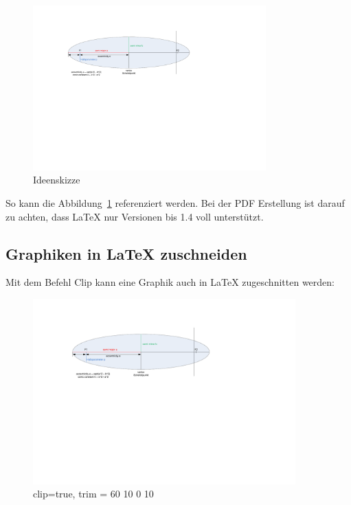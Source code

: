 \begin{figure}[H]
	\centering
		\includegraphics[width=0.8\textwidth]{images/visio/visio.pdf}
	\caption{Ideenskizze}
	\label{fig.Skizze}
\end{figure}

So kann die Abbildung~\ref{fig.Skizze} referenziert werden. Bei der PDF Erstellung ist darauf zu achten, dass LaTeX nur Versionen bis 1.4 voll unterstützt. 



\subsection{Graphiken in LaTeX zuschneiden}\label{zuschneiden}
Mit dem Befehl Clip kann eine Graphik auch in LaTeX zugeschnitten werden:

\begin{figure}[H]
	\centering
		\includegraphics[width=0.9\textwidth, clip=true, trim = 80 10 0 10]{images/visio/visio.pdf}  %
	\caption{clip=true, trim = 60 10 0 10}
	\label{fig.SkizzeZugeschnitten}
\end{figure}



